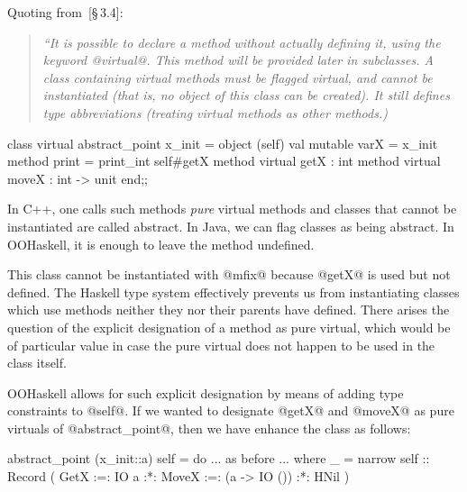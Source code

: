 \documentclass{jfp}
\begin{document}
Quoting from~\cite{OCaml}[\S\,3.4]:

\begin{quote}\itshape\small
``It is possible to declare a method without actually defining it,
using the keyword @virtual@. This method will be provided later in
subclasses. A class containing virtual methods must be flagged
virtual, and cannot be instantiated (that is, no object of this class
can be created). It still defines type abbreviations (treating virtual
methods as other methods.)
\end{quote}

\begin{code}
 class virtual abstract_point x_init =
   object (self)
     val mutable varX = x_init
     method print = print_int self#getX
     method virtual getX : int
     method virtual moveX : int -> unit
   end;;
\end{code}

In C++, one calls such methods \emph{pure} virtual methods and classes
that cannot be instantiated are called abstract. In Java, we can flag
classes as being abstract. In OOHaskell, it is enough to leave the
method undefined.


This class cannot be instantiated with @mfix@ because @getX@ is used
but not defined. The Haskell type system effectively prevents us from
instantiating classes which use methods neither they nor their parents
have defined. There arises the question of the explicit designation of
a method as pure virtual, which would be of particular value in case
the pure virtual does not happen to be used in the class itself.

OOHaskell allows for such explicit designation by means of adding type
constraints to @self@. If we wanted to designate @getX@ and @moveX@ as
pure virtuals of @abstract_point@, then we have enhance the class as
follows:

\begin{code}
 abstract_point (x_init::a) self =
   do
      ... as before ...
 where
  _ = narrow self :: Record (  GetX  :=: IO a
                           :*: MoveX :=: (a -> IO ())
                           :*: HNil )
\end{code}
\end{document}
